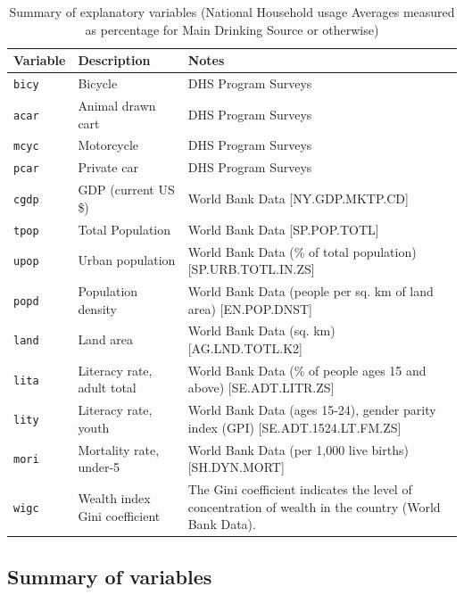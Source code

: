 \documentclass[10pt,twoside]{article}
\numberwithin{equation}{section}
\newcommand{\?}{\stackrel{?}{=}}
\begin{document}
\begin{table}[h!]
  \centering
  \begin{tabular}{p{1in} p{3in} p{2in}}\toprule
    \bf Variable & \bf Description & \bf Notes \\\midrule
 \texttt{bicy} & Bicycle
 & DHS Program Surveys
\\\midrule
 \texttt{acar} & Animal drawn cart
 & DHS Program Surveys
\\\midrule
 \texttt{mcyc} & Motorcycle
 & DHS Program Surveys
\\\midrule
 \texttt{pcar} & Private car
 & DHS Program Surveys
\\\midrule
 \texttt{cgdp} & GDP (current US \$) 
 & World Bank Data [NY.GDP.MKTP.CD]
\\\midrule
 \texttt{tpop} & Total Population
 & World Bank Data   [SP.POP.TOTL]
\\\midrule
 \texttt{upop} & Urban population 
 & World Bank Data  (\% of total population)  [SP.URB.TOTL.IN.ZS]
\\\midrule
 \texttt{popd} & Population density 
 & World Bank Data  (people per sq. km of land area)  [EN.POP.DNST]
\\\midrule
 \texttt{land} & Land area 
 & World Bank Data  (sq. km) [AG.LND.TOTL.K2]
\\\midrule
 \texttt{lita} & Literacy rate, adult total 
 & World Bank Data  (\% of people ages 15 and above) [SE.ADT.LITR.ZS]
\\\midrule
 \texttt{lity} & Literacy rate, youth 
 & World Bank Data  (ages 15-24), gender parity index (GPI) [SE.ADT.1524.LT.FM.ZS]
\\\midrule
 \texttt{mori} & Mortality rate, under-5 
 & World Bank Data  (per 1,000 live births) [SH.DYN.MORT]
\\\midrule
 \texttt{wigc} & Wealth index Gini coefficient
 & The Gini coefficient indicates the level of concentration of wealth in the country (World Bank Data).
 
  \\\bottomrule
  \end{tabular}
  \caption{Summary of explanatory variables (National Household usage Averages measured as percentage for Main Drinking Source or otherwise) }
  \label{tab:summary-var}
\end{table}

 \subsection*{Summary of variables}
\end{document}
